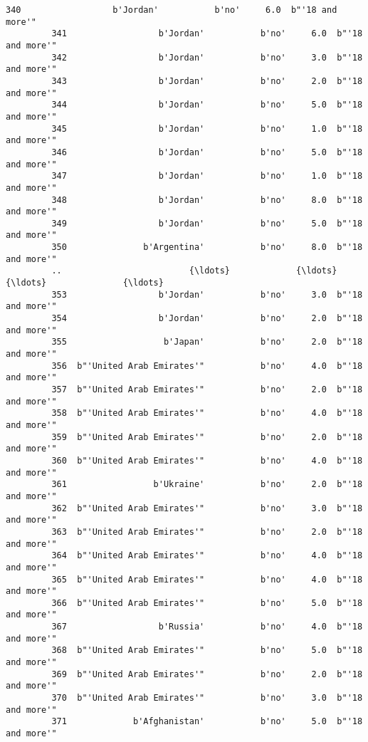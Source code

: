 \documentclass[11pt]{article}
\begin{document}
\begin{Verbatim}[commandchars=\\\{\}]
         340                  b'Jordan'           b'no'     6.0  b"'18 and more'"   
         341                  b'Jordan'           b'no'     6.0  b"'18 and more'"   
         342                  b'Jordan'           b'no'     3.0  b"'18 and more'"   
         343                  b'Jordan'           b'no'     2.0  b"'18 and more'"   
         344                  b'Jordan'           b'no'     5.0  b"'18 and more'"   
         345                  b'Jordan'           b'no'     1.0  b"'18 and more'"   
         346                  b'Jordan'           b'no'     5.0  b"'18 and more'"   
         347                  b'Jordan'           b'no'     1.0  b"'18 and more'"   
         348                  b'Jordan'           b'no'     8.0  b"'18 and more'"   
         349                  b'Jordan'           b'no'     5.0  b"'18 and more'"   
         350               b'Argentina'           b'no'     8.0  b"'18 and more'"   
         ..                         {\ldots}             {\ldots}     {\ldots}               {\ldots}   
         353                  b'Jordan'           b'no'     3.0  b"'18 and more'"   
         354                  b'Jordan'           b'no'     2.0  b"'18 and more'"   
         355                   b'Japan'           b'no'     2.0  b"'18 and more'"   
         356  b"'United Arab Emirates'"           b'no'     4.0  b"'18 and more'"   
         357  b"'United Arab Emirates'"           b'no'     2.0  b"'18 and more'"   
         358  b"'United Arab Emirates'"           b'no'     4.0  b"'18 and more'"   
         359  b"'United Arab Emirates'"           b'no'     2.0  b"'18 and more'"   
         360  b"'United Arab Emirates'"           b'no'     4.0  b"'18 and more'"   
         361                 b'Ukraine'           b'no'     2.0  b"'18 and more'"   
         362  b"'United Arab Emirates'"           b'no'     3.0  b"'18 and more'"   
         363  b"'United Arab Emirates'"           b'no'     2.0  b"'18 and more'"   
         364  b"'United Arab Emirates'"           b'no'     4.0  b"'18 and more'"   
         365  b"'United Arab Emirates'"           b'no'     4.0  b"'18 and more'"   
         366  b"'United Arab Emirates'"           b'no'     5.0  b"'18 and more'"   
         367                  b'Russia'           b'no'     4.0  b"'18 and more'"   
         368  b"'United Arab Emirates'"           b'no'     5.0  b"'18 and more'"   
         369  b"'United Arab Emirates'"           b'no'     2.0  b"'18 and more'"   
         370  b"'United Arab Emirates'"           b'no'     3.0  b"'18 and more'"   
         371             b'Afghanistan'           b'no'     5.0  b"'18 and more'"   

\end{Verbatim}
\end{document}
